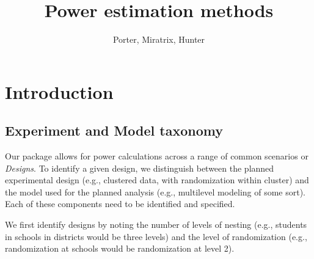 \documentclass[12pt]{article}
\begin{document}
\author{Porter, Miratrix, Hunter}
\title{Power estimation methods}

\maketitle

\tableofcontents 

\newpage
\section{Introduction}


\subsection{Experiment and Model taxonomy}

Our package allows for power calculations across a range of common scenarios or \emph{Designs}.
To identify a given design, we distinguish between the planned experimental design (e.g., clustered data, with randomization within cluster) and the model used for the planned analysis (e.g., multilevel modeling of some sort).
Each of these components need to be identified and specified.

We first identify designs by noting the number of levels of nesting (e.g., students in schools in districts would be three levels) and the level of randomization (e.g., randomization at schools would be randomization at level 2).
\end{document}
